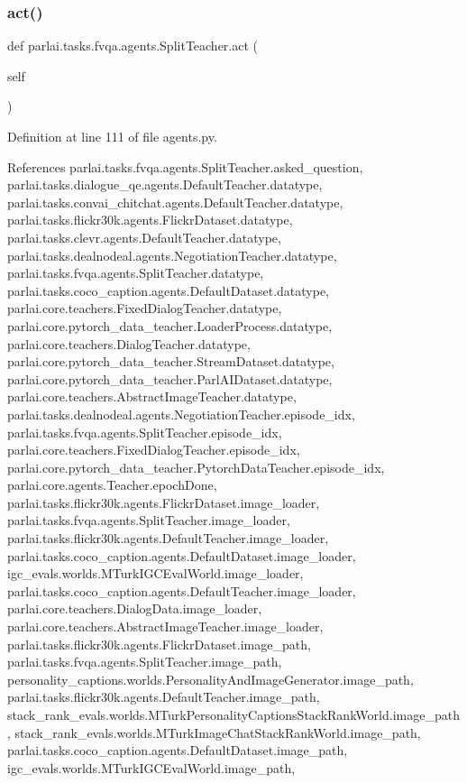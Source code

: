 \subsubsection{\texorpdfstring{act()}{act()}}
{\footnotesize\ttfamily def parlai.\+tasks.\+fvqa.\+agents.\+Split\+Teacher.\+act (\begin{DoxyParamCaption}\item[{}]{self }\end{DoxyParamCaption})}



Definition at line 111 of file agents.\+py.



References parlai.\+tasks.\+fvqa.\+agents.\+Split\+Teacher.\+asked\+\_\+question, parlai.\+tasks.\+dialogue\+\_\+qe.\+agents.\+Default\+Teacher.\+datatype, parlai.\+tasks.\+convai\+\_\+chitchat.\+agents.\+Default\+Teacher.\+datatype, parlai.\+tasks.\+flickr30k.\+agents.\+Flickr\+Dataset.\+datatype, parlai.\+tasks.\+clevr.\+agents.\+Default\+Teacher.\+datatype, parlai.\+tasks.\+dealnodeal.\+agents.\+Negotiation\+Teacher.\+datatype, parlai.\+tasks.\+fvqa.\+agents.\+Split\+Teacher.\+datatype, parlai.\+tasks.\+coco\+\_\+caption.\+agents.\+Default\+Dataset.\+datatype, parlai.\+core.\+teachers.\+Fixed\+Dialog\+Teacher.\+datatype, parlai.\+core.\+pytorch\+\_\+data\+\_\+teacher.\+Loader\+Process.\+datatype, parlai.\+core.\+teachers.\+Dialog\+Teacher.\+datatype, parlai.\+core.\+pytorch\+\_\+data\+\_\+teacher.\+Stream\+Dataset.\+datatype, parlai.\+core.\+pytorch\+\_\+data\+\_\+teacher.\+Parl\+A\+I\+Dataset.\+datatype, parlai.\+core.\+teachers.\+Abstract\+Image\+Teacher.\+datatype, parlai.\+tasks.\+dealnodeal.\+agents.\+Negotiation\+Teacher.\+episode\+\_\+idx, parlai.\+tasks.\+fvqa.\+agents.\+Split\+Teacher.\+episode\+\_\+idx, parlai.\+core.\+teachers.\+Fixed\+Dialog\+Teacher.\+episode\+\_\+idx, parlai.\+core.\+pytorch\+\_\+data\+\_\+teacher.\+Pytorch\+Data\+Teacher.\+episode\+\_\+idx, parlai.\+core.\+agents.\+Teacher.\+epoch\+Done, parlai.\+tasks.\+flickr30k.\+agents.\+Flickr\+Dataset.\+image\+\_\+loader, parlai.\+tasks.\+fvqa.\+agents.\+Split\+Teacher.\+image\+\_\+loader, parlai.\+tasks.\+flickr30k.\+agents.\+Default\+Teacher.\+image\+\_\+loader, parlai.\+tasks.\+coco\+\_\+caption.\+agents.\+Default\+Dataset.\+image\+\_\+loader, igc\+\_\+evals.\+worlds.\+M\+Turk\+I\+G\+C\+Eval\+World.\+image\+\_\+loader, parlai.\+tasks.\+coco\+\_\+caption.\+agents.\+Default\+Teacher.\+image\+\_\+loader, parlai.\+core.\+teachers.\+Dialog\+Data.\+image\+\_\+loader, parlai.\+core.\+teachers.\+Abstract\+Image\+Teacher.\+image\+\_\+loader, parlai.\+tasks.\+flickr30k.\+agents.\+Flickr\+Dataset.\+image\+\_\+path, parlai.\+tasks.\+fvqa.\+agents.\+Split\+Teacher.\+image\+\_\+path, personality\+\_\+captions.\+worlds.\+Personality\+And\+Image\+Generator.\+image\+\_\+path, parlai.\+tasks.\+flickr30k.\+agents.\+Default\+Teacher.\+image\+\_\+path, stack\+\_\+rank\+\_\+evals.\+worlds.\+M\+Turk\+Personality\+Captions\+Stack\+Rank\+World.\+image\+\_\+path, stack\+\_\+rank\+\_\+evals.\+worlds.\+M\+Turk\+Image\+Chat\+Stack\+Rank\+World.\+image\+\_\+path, parlai.\+tasks.\+coco\+\_\+caption.\+agents.\+Default\+Dataset.\+image\+\_\+path, igc\+\_\+evals.\+worlds.\+M\+Turk\+I\+G\+C\+Eval\+World.\+image\+\_\+path, 